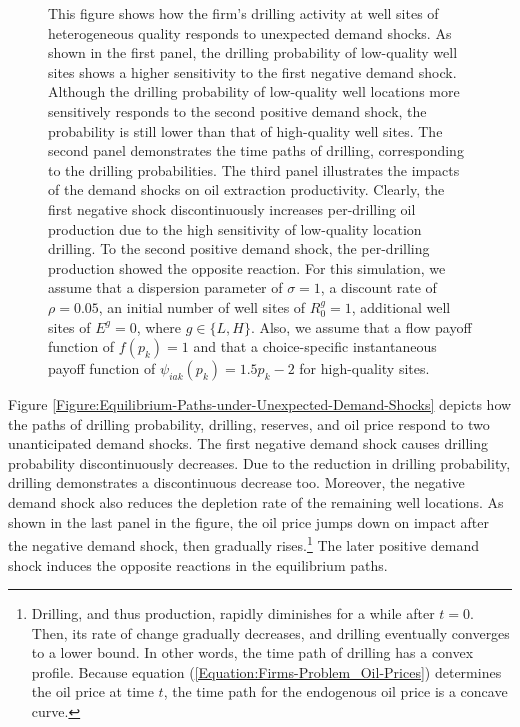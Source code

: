 {\begin{figure}[t!]
{{            This figure shows how the firm's drilling activity at well sites of heterogeneous quality responds to unexpected demand shocks. As shown in the first panel, the drilling probability of low-quality well sites shows a higher sensitivity to the first negative demand shock. Although the drilling probability of low-quality well locations more sensitively responds to the second positive demand shock, the probability is still lower than that of high-quality well sites. The second panel demonstrates the time paths of drilling, corresponding to the drilling probabilities. The third panel illustrates the impacts of the demand shocks on oil extraction productivity. Clearly, the first negative shock discontinuously increases per-drilling oil production due to the high sensitivity of low-quality location drilling. To the second positive demand shock, the per-drilling production showed the opposite reaction. For this simulation, we assume that a dispersion parameter of $\sigma = 1$, a discount rate of $\rho = 0.05$, an initial number of well sites of $R_{0}^{g} = 1$, additional well sites of $E^{g} = 0$, where $g \in \{ L, H \}$. Also, we assume that a flow payoff function of $f(p_{k}) = 1$ and that a choice-specific instantaneous payoff function of $\psi_{iak} (p_{k}) = 1.5p_{k} - 2$ for high-quality sites.  
        }}
        \label{Figure:Heterogeneous-Impacts-of-Unexpected-Price-Shocks-on-Equilibrium-Paths}
    \end{figure}
}

Figure \ref{Figure:Equilibrium-Paths-under-Unexpected-Demand-Shocks} depicts how the paths of drilling probability, drilling, reserves, and oil price respond to two unanticipated demand shocks. The first negative demand shock causes drilling probability discontinuously decreases. Due to the reduction in drilling probability, drilling demonstrates a discontinuous decrease too. Moreover, the negative demand shock also reduces the depletion rate of the remaining well locations. As shown in the last panel in the figure, the oil price jumps down on impact after the negative demand shock, then gradually rises.\footnote{Drilling, and thus production, rapidly diminishes for a while after $t = 0$. Then, its rate of change gradually decreases, and drilling eventually converges to a lower bound. In other words, the time path of drilling has a convex profile. Because equation (\ref{Equation:Firms-Problem_Oil-Prices}) determines the oil price at time $t$, the time path for the endogenous oil price is a concave curve.} The later positive demand shock induces the opposite reactions in the equilibrium paths. 
